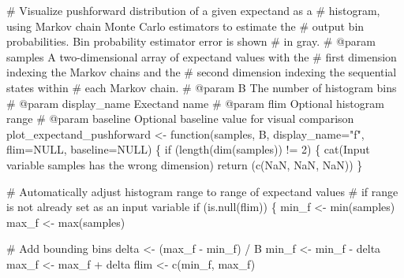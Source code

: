 \documentclass[
  letterpaper,
  DIV=11,
  numbers=noendperiod]{scrartcl}
\newenvironment{Shaded}{\begin{snugshade}}{\end{snugshade}}
\newcommand{\AttributeTok}[1]{\textcolor[rgb]{0.40,0.45,0.13}{#1}}
\newcommand{\CommentTok}[1]{\textcolor[rgb]{0.37,0.37,0.37}{#1}}
\newcommand{\ConstantTok}[1]{\textcolor[rgb]{0.56,0.35,0.01}{#1}}
\newcommand{\ControlFlowTok}[1]{\textcolor[rgb]{0.00,0.23,0.31}{#1}}
\newcommand{\DecValTok}[1]{\textcolor[rgb]{0.68,0.00,0.00}{#1}}
\newcommand{\FunctionTok}[1]{\textcolor[rgb]{0.28,0.35,0.67}{#1}}
\newcommand{\NormalTok}[1]{\textcolor[rgb]{0.00,0.23,0.31}{#1}}
\newcommand{\OtherTok}[1]{\textcolor[rgb]{0.00,0.23,0.31}{#1}}
\newcommand{\SpecialCharTok}[1]{\textcolor[rgb]{0.37,0.37,0.37}{#1}}
\newcommand{\StringTok}[1]{\textcolor[rgb]{0.13,0.47,0.30}{#1}}
\begin{document}
\begin{Shaded}
\begin{Highlighting}[]
\CommentTok{\# Visualize pushforward distribution of a given expectand as a }
\CommentTok{\# histogram, using Markov chain Monte Carlo estimators to estimate the }
\CommentTok{\# output bin probabilities.  Bin probability estimator error is shown }
\CommentTok{\# in gray.}
\CommentTok{\# @param samples A two{-}dimensional array of expectand values with the }
\CommentTok{\#                first dimension indexing the Markov chains and the }
\CommentTok{\#                second dimension indexing the sequential states within }
\CommentTok{\#                each Markov chain.}
\CommentTok{\# @param B The number of histogram bins}
\CommentTok{\# @param display\_name Exectand name}
\CommentTok{\# @param flim Optional histogram range}
\CommentTok{\# @param baseline Optional baseline value for visual comparison}
\NormalTok{plot\_expectand\_pushforward }\OtherTok{\textless{}{-}} \ControlFlowTok{function}\NormalTok{(samples, B, }\AttributeTok{display\_name=}\StringTok{"f"}\NormalTok{, }
                                       \AttributeTok{flim=}\ConstantTok{NULL}\NormalTok{, }\AttributeTok{baseline=}\ConstantTok{NULL}\NormalTok{) \{}
  \ControlFlowTok{if}\NormalTok{ (}\FunctionTok{length}\NormalTok{(}\FunctionTok{dim}\NormalTok{(samples)) }\SpecialCharTok{!=} \DecValTok{2}\NormalTok{) \{}
    \FunctionTok{cat}\NormalTok{(}\StringTok{\textquotesingle{}Input variable \textasciigrave{}samples\textasciigrave{} has the wrong dimension\textquotesingle{}}\NormalTok{)}
    \FunctionTok{return}\NormalTok{ (}\FunctionTok{c}\NormalTok{(}\ConstantTok{NaN}\NormalTok{, }\ConstantTok{NaN}\NormalTok{, }\ConstantTok{NaN}\NormalTok{))}
\NormalTok{  \}}
  
  \CommentTok{\# Automatically adjust histogram range to range of expectand values}
  \CommentTok{\# if range is not already set as an input variable}
  \ControlFlowTok{if}\NormalTok{ (}\FunctionTok{is.null}\NormalTok{(flim)) \{}
\NormalTok{    min\_f }\OtherTok{\textless{}{-}} \FunctionTok{min}\NormalTok{(samples)}
\NormalTok{    max\_f }\OtherTok{\textless{}{-}} \FunctionTok{max}\NormalTok{(samples)}
    
    \CommentTok{\# Add bounding bins}
\NormalTok{    delta }\OtherTok{\textless{}{-}}\NormalTok{ (max\_f }\SpecialCharTok{{-}}\NormalTok{ min\_f) }\SpecialCharTok{/}\NormalTok{ B}
\NormalTok{    min\_f }\OtherTok{\textless{}{-}}\NormalTok{ min\_f }\SpecialCharTok{{-}}\NormalTok{ delta}
\NormalTok{    max\_f }\OtherTok{\textless{}{-}}\NormalTok{ max\_f }\SpecialCharTok{+}\NormalTok{ delta}
\NormalTok{    flim }\OtherTok{\textless{}{-}} \FunctionTok{c}\NormalTok{(min\_f, max\_f)}
    

\end{Highlighting}
\end{Shaded}
\end{document}

